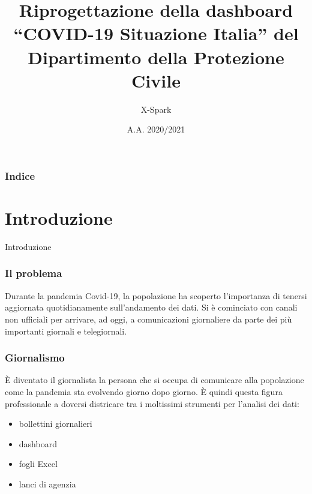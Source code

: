 \documentclass[handout]{beamer}
\title[Riprogettazione della dashboard\\``COVID-19 Situazione Italia'']{Riprogettazione della dashboard\\``COVID-19 Situazione Italia'' del Dipartimento della Protezione Civile}
\author{X-Spark}
\institute[UniBo]{LM Informatica\\
Università di Bologna - Alma Mater Studiorum}
\date{A.A. 2020/2021}
\begin{document}
	\begin{frame}[plain]
	  \titlepage
	\end{frame}
	\begin{frame}
  		\frametitle{Indice}
		\tableofcontents
	\end{frame}
	
	\section{Introduzione}
	\begin{frame}
		\centering
		\begin{Huge}
			Introduzione
		\end{Huge}
		\end{frame}

		\begin{frame}
			\frametitle{Il problema}
			Durante la pandemia Covid-19, la popolazione ha scoperto l'importanza di tenersi aggiornata quotidianamente sull'andamento dei dati.\newline \newline
			Si è cominciato con canali non ufficiali per arrivare, ad oggi, a comunicazioni giornaliere da parte dei più importanti giornali e telegiornali.
		\end{frame}

		\begin{frame}
			\frametitle{Giornalismo}
			\`E diventato il giornalista la persona che si occupa di comunicare alla popolazione come la pandemia sta evolvendo giorno dopo giorno.\newline \newline
			\`E quindi questa figura professionale a doversi districare tra i moltissimi strumenti per l'analisi dei dati:
			\begin{itemize}[<+->]
				\item bollettini giornalieri\\
				\item dashboard\\
				\item fogli Excel\\
				\item lanci di agenzia\\
			\end{itemize}
		\end{frame}
\end{document}
